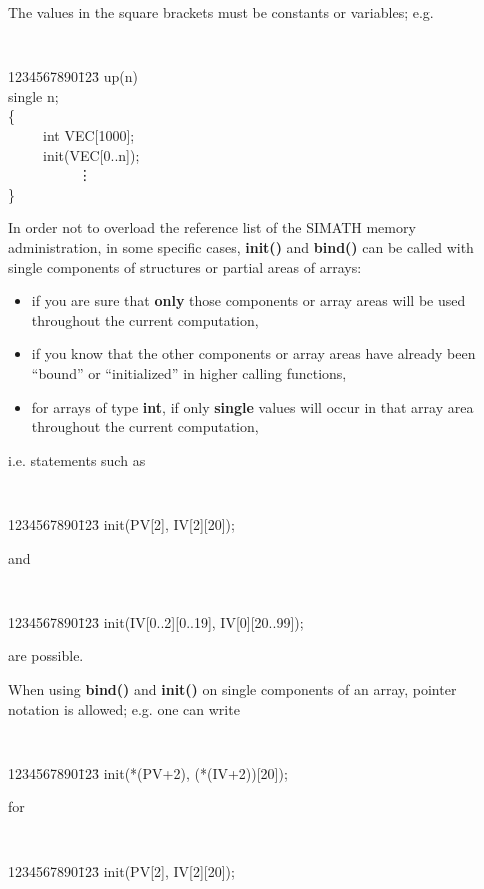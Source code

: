The values in the square brackets must be constants or variables; e.g.
   {\tt
    \begin{tabbing}
    1234567890\=123\=\kill
    \>  up(n)\\
    \>  single n;\\
    \>  \{ \\
    \>  \ \ \ \ \  int VEC[1000];\\
    \>  \ \ \ \ \  init(VEC[0..n]);\\
    \>  \ \ \ \ \ \ \ \ \ \ \vdots\\
    \>  \}
    \end{tabbing}
   }

\newpage

In order not to overload the reference list of the SIMATH memory ad\-mi\-nistra\-tion,
in some specific cases, {\bf init()} and {\bf bind()} can be called with
single components of structures or partial areas of arrays:
\begin{itemize}
\item if you are sure that {\bf only} those components or array areas will
      be used throughout the current computation,
\item if you know that the other components or array areas have already been
      ``bound'' or ``initialized'' in higher calling functions,
\item for arrays of type {\bf int}, if only {\bf single} values will occur
      in that array area throughout the current computation,
\end{itemize}
i.e. statements such as
   {\tt
    \begin{tabbing}
    1234567890\=123\=\kill
    \> init(PV[2], IV[2][20]);
    \end{tabbing}
   }
and
   {\tt
    \begin{tabbing}
    1234567890\=123\=\kill
    \> init(IV[0..2][0..19], IV[0][20..99]);
    \end{tabbing}
   }
are possible.

When using {\bf bind()} and {\bf init()} on single components of an array, 
pointer notation is allowed; e.g. one can write
   {\tt 
    \begin{tabbing}
    1234567890\=123\=\kill
    \>  init(*(PV+2), (*(IV+2))[20]);    
    \end{tabbing}
   }
for
   {\tt 
    \begin{tabbing}
    1234567890\=123\=\kill
    \>  init(PV[2], IV[2][20]);    
    \end{tabbing}
   }


